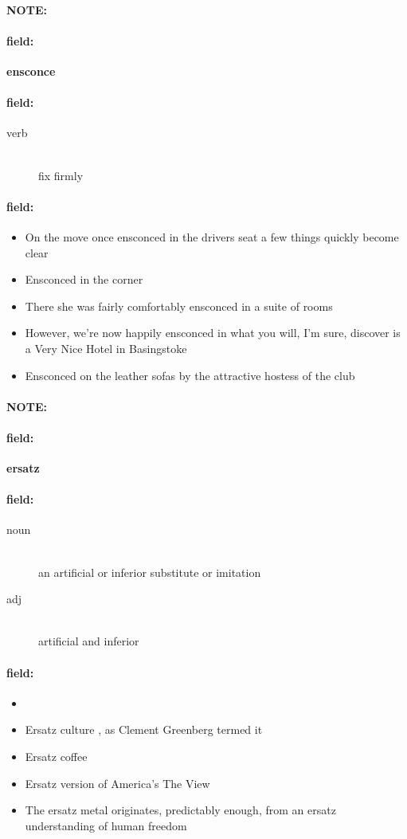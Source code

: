 \documentclass[12pt]{article}
\newenvironment{note}{\paragraph{NOTE:}}{}
\newenvironment{field}{\paragraph{field:}}{}
\begin{document}
\begin{note}
\begin{field}
\textbf{\large ensconce}
\end{field}


\begin{field}
\begin{description}
\item[verb] \hfill \\ 
fix firmly

\end{description}
\end{field}

\begin{field}
\begin{itemize}
\item On the move once ensconced in the drivers seat a few things quickly become clear
\item Ensconced in the corner
\item There she was fairly comfortably ensconced in a suite of rooms
\item However, we're now happily ensconced in what you will, I'm sure, discover is a Very Nice Hotel in Basingstoke
\item Ensconced on the leather sofas by the attractive hostess of the club
\end{itemize}
\end{field}
\end{note}
\begin{note}
\begin{field}
\textbf{\large ersatz}
\end{field}


\begin{field}
\begin{description}
\item[noun] \hfill \\ 
an artificial or inferior substitute or imitation

\item[adj] \hfill \\ 
artificial and inferior

\end{description}
\end{field}

\begin{field}
\begin{itemize}
\item 
\item Ersatz culture , as Clement Greenberg termed it
\item Ersatz coffee
\item Ersatz version of America's The View
\item The ersatz metal originates, predictably enough, from an ersatz understanding of human freedom
\end{itemize}
\end{field}
\end{note}
\end{document}
